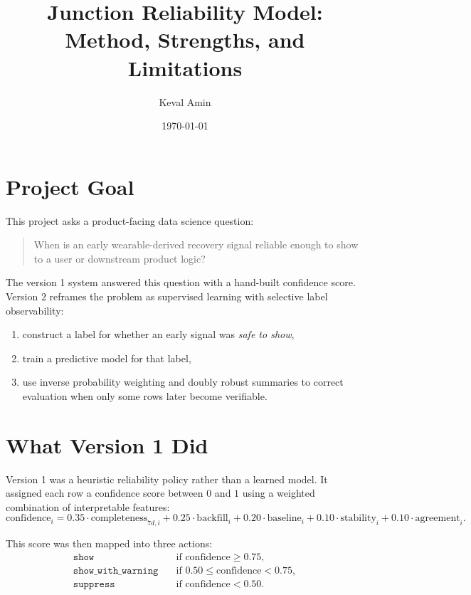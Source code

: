 \documentclass[11pt]{article}
\title{Junction Reliability Model: Method, Strengths, and Limitations}
\author{Keval Amin}
\date{\today}
\begin{document}
\maketitle

\section{Project Goal}

This project asks a product-facing data science question:
\begin{quote}
When is an early wearable-derived recovery signal reliable enough to show to a user or downstream product logic?
\end{quote}

The version 1 system answered this question with a hand-built confidence score. Version 2 reframes the problem as supervised learning with selective label observability:
\begin{enumerate}[leftmargin=1.5em]
    \item construct a label for whether an early signal was \emph{safe to show},
    \item train a predictive model for that label,
    \item use inverse probability weighting and doubly robust summaries to correct evaluation when only some rows later become verifiable.
\end{enumerate}

\section{What Version 1 Did}

Version 1 was a heuristic reliability policy rather than a learned model. It assigned each row a confidence score between $0$ and $1$ using a weighted combination of interpretable features:
\[
\text{confidence}_i
=
0.35 \cdot \text{completeness}_{7d,i}
+ 0.25 \cdot \text{backfill}_i
+ 0.20 \cdot \text{baseline}_i
+ 0.10 \cdot \text{stability}_i
+ 0.10 \cdot \text{agreement}_i.
\]

This score was then mapped into three actions:
\begin{align*}
\texttt{show} &\quad \text{if confidence} \ge 0.75, \\
\texttt{show\_with\_warning} &\quad \text{if } 0.50 \le \text{confidence} < 0.75, \\
\texttt{suppress} &\quad \text{if confidence} < 0.50.
\end{align*}
\end{document}
